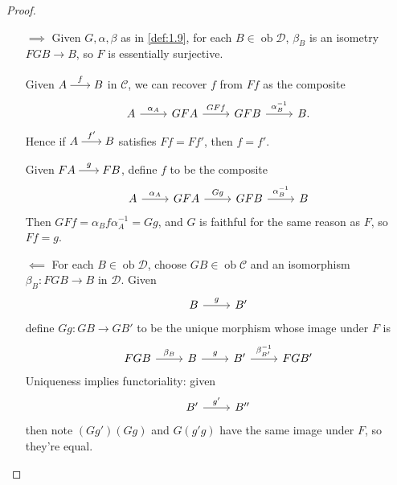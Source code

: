 \documentclass{article}
\DeclareMathOperator{\ob}{ob}
\newenvironment{tikzcdi}{\begin{tikzcd}[cramped, sep=scriptsize]}{\end{tikzcd}}
\let\to\longrightarrow
\begin{document}
\begin{proof}\leavevmode
  \begin{itemize}
    \item[$\implies$] Given $G,\alpha,\beta$ as in \cref{def:1.9}, for each $B\in\ob\mathscr{D}$, $\beta_B$ is an isometry $FGB\to B$, so $F$ is essentially surjective.

     Given $\begin{tikzcdi} A \rar{f}& B \end{tikzcdi}$ in $\mathcal{C}$, we can recover $f$ from $Ff$ as the composite
      \begin{equation*}
        \begin{tikzcd}
          A\rar{\alpha_A} & GFA\rar{GFf} &GFB\rar{\alpha_B^{-1}} & B.
        \end{tikzcd}
      \end{equation*}
      Hence if $\begin{tikzcdi} A \rar{f'}& B \end{tikzcdi}$ satisfies $Ff=Ff'$, then $f=f'$.

    Given $\begin{tikzcdi} FA \rar{g}& FB \end{tikzcdi}$, define $f$ to be the composite
      \begin{equation*}
        \begin{tikzcd}
          A\rar{\alpha_A} & GFA\rar{Gg} & GFB\rar{\alpha_B^{-1}} & B
        \end{tikzcd}
      \end{equation*}
      Then $GFf = \alpha_Bf\alpha_A^{-1} = Gg$, and $G$ is faithful for the same reason as $F$, so $Ff = g$.

    \item[$ \impliedby $] For each $B\in\ob\mathscr{D}$, choose $ GB\in\ob\mathscr{C}$ and an isomorphism $\beta_B: FGB \to B$ in $\mathscr{D}$.
      Given
      \begin{equation*}
        \begin{tikzcd}
          B\rar{g} & B'
        \end{tikzcd}
      \end{equation*}
      define $Gg: GB \to GB'$ to be the unique morphism whose image under $F$ is
      \begin{equation*}
        \begin{tikzcd}
          FGB\rar{\beta_B} & B\rar{g} & B'\rar{\beta_{B'}^{-1}} & FGB'
        \end{tikzcd}
      \end{equation*}
      Uniqueness implies functoriality: given
      \begin{equation*}
        \begin{tikzcd}
          B'\rar{g'} & B''
        \end{tikzcd}
      \end{equation*}
      then note $(Gg')(Gg)$ and $G(g' g)$ have the same image under $F$, so they're equal.


\end{itemize}
\end{proof}
\end{document}
